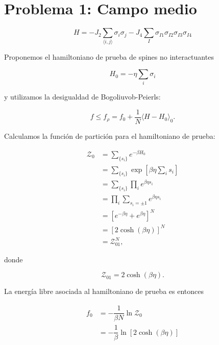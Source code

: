 \documentclass[10pt]{article}
\begin{document}
\section*{Problema 1: Campo medio}

\begin{equation}
H = -J_2 \sum_{\langle i,j\rangle} \sigma_i \sigma_j - J_4 \sum_I \sigma_{I1}\sigma_{I2}\sigma_{I3}\sigma_{I4}
\end{equation}

Proponemos el hamiltoniano de prueba de spines no interactuantes

\begin{equation}
H_0 = -\eta \sum_i \sigma_i
\end{equation}

y utilizamos la desigualdad de Bogoliuvob-Peierls:

\begin{equation}
f \leq f_{\rho} = f_0 + \dfrac{1}{N} \langle H - H_0 \rangle_0.
\end{equation}

Calculamos la funci\'on de partici\'on para el hamiltoniano de prueba:

\begin{align}
\mathcal{Z}_0 &= \sum_{\lbrace s_i\rbrace} e^{-\beta H_0} \nonumber \\
&= \sum_{\lbrace s_i\rbrace} \exp \left[ \beta \eta \sum_i s_i  \right] \nonumber \\
&= \sum_{\lbrace s_i\rbrace} \prod_i  e^{\beta \eta s_i} \nonumber \\
&= \prod_i \sum_{s_i=\pm1} e^{\beta \eta s_i}  \nonumber \\
&= \left[ e^{-\beta \eta} + e^{\beta \eta} \right]^N \nonumber \\
&= \left[ 2 \cosh\left(\beta \eta\right) \right]^N \nonumber \\
&= \mathcal{Z}_{01}^N,
\end{align}

donde 

\begin{equation}
\mathcal{Z}_{01} = 2 \cosh\left(\beta \eta\right).
\end{equation}

La energ\'ia libre asociada al hamiltoniano de prueba es entonces

\begin{align}
f_0 &= -\dfrac{1}{\beta N} \ln \mathcal{Z}_0 \nonumber \\
&= -\dfrac{1}{\beta} \ln \left[ 2 \cosh\left(\beta \eta\right) \right]
\end{align}
\end{document}

